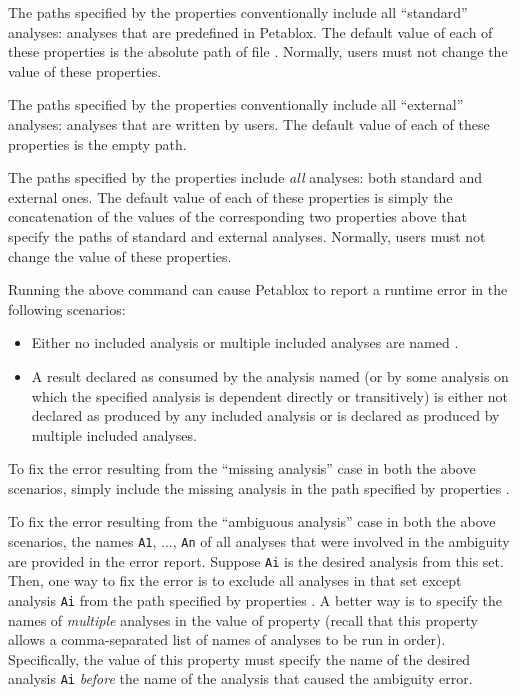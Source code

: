 The paths specified by the  properties
conventionally include all ``standard'' analyses: analyses that are predefined
in Petablox.  The default value of each of these properties is the absolute path
of file .  Normally, users must not change the value of these
properties.

The paths specified by the  properties
conventionally include all ``external'' analyses: analyses that are written by
users.  The default value of each of these properties is the empty path.

The paths specified by the  properties include
{\it all} analyses: both standard and external ones.  The default value of each
of these properties is simply the concatenation of the values of the
corresponding two properties above that specify the paths of standard and
external analyses.  Normally, users must not change the value of these
properties.

Running the above command can cause Petablox to report a runtime error in the
following scenarios:

\begin{itemize}
\item
Either no included analysis or multiple included analyses are named
.
\item
A result declared as consumed by the analysis named 
(or by some analysis on which the specified analysis is dependent directly or
transitively) is either not declared as produced by any included analysis or
is declared as produced by multiple included analyses.
\end{itemize}

To fix the error resulting from the ``missing analysis'' case in both the above
scenarios, simply include the missing analysis in the path specified by
properties .

To fix the error resulting from the ``ambiguous analysis'' case in both the
above scenarios, the names {\tt A1}, ..., {\tt An} of all analyses that were
involved in the ambiguity are provided in the error report.  Suppose {\tt Ai}
is the desired analysis from this set.  Then, one way to fix the error is to
exclude all analyses in that set except analysis {\tt Ai} from the path
specified by properties .  A better way is to
specify the names of {\it multiple} analyses in the value of property
 (recall that this property allows a comma-separated
list of names of analyses to be run in order).  Specifically, the value of
this property must specify the name of the desired analysis {\tt Ai}
{\it before} the name of the analysis that caused the ambiguity error.

